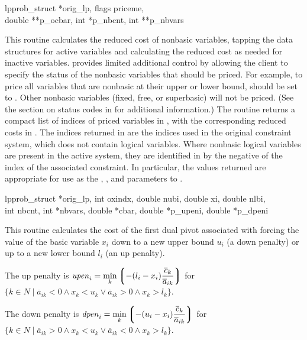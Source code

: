 \begin{subrdoc}
  \item
	  {lpprob_struct *orig_lp, flags priceme, \\
	   double **p_ocbar, int *p_nbcnt, int **p_nbvars}
  
  This routine calculates the reduced cost of nonbasic variables, tapping
  the \dylp data structures for active variables and calculating the reduced
  cost as needed for inactive variables.
   provides limited additional control by allowing the client
  to specify the status of the nonbasic variables that should be priced.
  For example, to price all variables that are nonbasic at their upper or
  lower bound,
   should be set to .
  Other nonbasic variables (fixed, free, or superbasic) will not be priced.
  (See the section on status codes in  for additional
  information.)
  The routine returns a compact list of  indices of priced
  variables in , with the corresponding reduced costs in
  .
  The indices returned in  are the indices used in the original
  constraint system, which does not contain logical variables.
  Where nonbasic logical variables are present in the active system, they are
  identified in  by the negative of the index of the
  associated constraint.
  In particular, the values returned are appropriate for use as
  the ,
  , and  parameters to .

  \item
	  {lpprob_struct *orig_lp, int oxindx,
	   double nubi, double xi, double nlbi, \\
	   int nbcnt, int *nbvars,
	   double *cbar, double *p_upeni, double *p_dpeni}
  
  This routine calculates the cost of the first dual pivot associated with
  forcing the value of the basic variable $x_i$ 
  down to a new upper bound $u_i$ (a down penalty) or up to a new
  lower bound $l_i$ (an up penalty).
  
  The up penalty is
  $\displaystyle \mathit{upen}_i = \min_k \left\lgroup -(l_i - x_i)
		\frac{\overline{c}_k}{\overline{a}_{ik}} \right\rgroup$
  for $\{k \in N \mid \overline{a}_{ik} < 0 \wedge x_k < u_k \vee
		   \overline{a}_{ik} > 0 \wedge x_k > l_k\}$.

  The down penalty is
  $\displaystyle \mathit{dpen}_i = \min_k  \left\lgroup -(u_i - x_i)
		\frac{\overline{c}_k}{\overline{a}_{ik}}\right\rgroup$
  for $\{k \in N \mid \overline{a}_{ik} > 0 \wedge x_k < u_k \vee
		   \overline{a}_{ik} < 0 \wedge x_k > l_k\}$.


\end{subrdoc}
